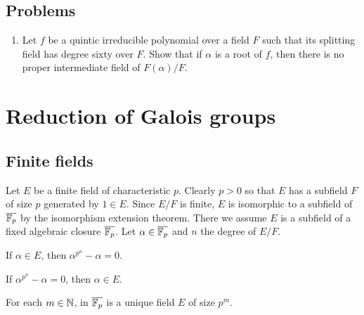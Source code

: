\documentclass{../note}
\begin{document}
\section*{Problems}
\begin{enumerate}
\item Let $f$ be a quintic irreducible polynomial over a field $F$ such that its splitting field has degree sixty over $F$. Show that if $\alpha$ is a root of $f$, then there is no proper intermediate field of $F(\alpha)/F$.
\end{enumerate}








\chapter{Reduction of Galois groups}

\section{Finite fields}
\begin{prb}
Let $E$ be a finite field of characteristic $p$.
Clearly $p>0$ so that $E$ has a subfield $F$ of size $p$ generated by $1\in E$.
Since $E/F$ is finite, $E$ is isomorphic to a subfield of $\overline{\mathbb{F}_p}$ by the isomorphism extension theorem.
There we assume $E$ is a subfield of a fixed algebraic closure $\overline{\mathbb{F}_p}$.
Let $\alpha\in\overline{\mathbb{F}_p}$ and $n$ the degree of $E/F$.
\begin{parts}
\item If $\alpha\in E$, then $\alpha^{p^n}-\alpha=0$.
\item If $\alpha^{p^n}-\alpha=0$, then $\alpha\in E$.
\item For each $m\in\mathbb{N}$, in $\overline{\mathbb{F}_p}$ is a unique field $E$ of size $p^m$.
\end{parts}
\end{prb}
\end{document}
